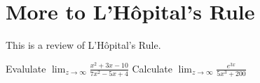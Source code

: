 \section*{More to L'H\^opital's Rule}

This is a review of L'H\^opital's Rule.

\begin{questions}
\question
Evalulate $\displaystyle{\lim_{z\to \infty} \frac{x^2+3x-10}{7x^2-5x+4}}$
\vspace{2in}
\question
Calculate
$\displaystyle{\lim_{z\to \infty} \frac{e^{3x}}{5x^3+200}}$
\end{questions}
